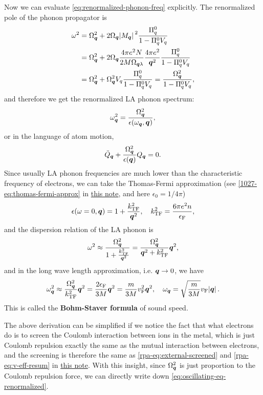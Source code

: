 \documentclass[hyperref, a4paper]{article}
\newcommand*{\concept}[1]{{\textbf{#1}}}
\newcommand{\rpanote}{\href{./electron-gas.pdf}{this note}}
\newcommand{\advancedelenote}{\href{../advanced-electrodynamics/lecture-10-27.pdf}{this note}}
\begin{document}
Now we can evaluate \eqref{eq:renormalized-phonon-freq} explicitly. The renormalized pole of the phonon propagator is 
\[
    \begin{aligned}
        \omega^2 &= \Omega^2_{\vb*{q}} + 2 \Omega_{\vb*{q}} \abs*{M_{\vb*{q}}}^2 \frac{\Pi^0_q}{1 - \Pi^0_q V_q} \\
        &= \Omega^2_{\vb*{q}} + 2 \Omega_{\vb*{q}} \frac{4 \pi e^2 N}{2M \Omega_{\vb*{q} \lambda}} \frac{4 \pi e^2}{\vb*{q}^2} \frac{\Pi^0_q}{1 - \Pi^0_q V_q}  \\
        &= \Omega^2_{\vb*{q}} + \Omega^2_{\vb*{q}} V_q \frac{\Pi^0_q}{1 - \Pi^0_q V_q} = \frac{\Omega^2_{\vb*{q}}}{1 - \Pi^0_q V_q},
    \end{aligned}
\]
and therefore we get the renormalized LA phonon spectrum:
\begin{equation}
    \omega_{\vb*{q}}^2 = \frac{\Omega_{\vb*{q}}^2}{\epsilon(\omega_{\vb*{q}}, \vb*{q})} ,
\end{equation}
or in the language of atom motion, 
\begin{equation}
    \ddot{Q}_{\vb*{q}} + \frac{\Omega_{\vb*{q}}^2}{\epsilon(\vb*{q})} Q_{\vb*{q}} = 0.
    \label{eq:oscillating-eq-renormalized}
\end{equation}
Since usually LA phonon frequencies are much lower than the characteristic frequency of electrons, we can take 
the Thomas-Fermi approximation (see \eqref{1027-eq:thomas-fermi-approx} in \advancedelenote, and here $\epsilon_0 = 1 / 4 \pi$)
\begin{equation}
    \epsilon(\omega=0, \vb*{q}) = 1 + \frac{k_\text{TF}^2}{\vb*{q}^2}, \quad k_\text{TF}^2 = \frac{6 \pi e^2 n}{\epsilon_\text{F}},
\end{equation}
and the dispersion relation of the LA phonon is 
\[
    \omega^2 \approx \frac{\Omega^2_{\vb*{q}}}{1 + \frac{k_\text{TF}^2}{\vb*{q}^2}} = \frac{\Omega^2_{\vb*{q}}}{\vb*{q}^2 + k_\text{TF}^2} \vb*{q}^2,
\] 
and in the long wave length approximation, i.e. $\vb*{q} \to 0$, we have 
\begin{equation}
    \omega_{\vb*{q}}^2 \approx \frac{\Omega^2_{\vb*{q}}}{k_\text{TF}^2} \vb*{q}^2 = \frac{2 \epsilon_\text{F}}{3M} \vb*{q}^2 = \frac{m}{3 M} v_\text{F}^2 \vb*{q}^2, \quad \omega_{\vb*{q}} = \sqrt{\frac{m}{3M}} v_\text{F} \abs*{\vb*{q}}. 
\end{equation}
This is called the \concept{Bohm-Staver formula} of sound speed.

The above derivation can be simplified if we notice the fact that what electrons do is to screen the Coulomb 
interaction between ions in the metal, which is just Coulomb repulsion exactly the same as the mutual 
interaction between electrons, and the screening is therefore the same as \eqref{rpa-eq:external-screened} 
and  \eqref{rpa-eq:v-eff-resum} in \rpanote. 
With this insight, since $\Omega_{\vb*{q}}^2$ is just proportion to 
the Coulomb repulsion force, we can directly write down \eqref{eq:oscillating-eq-renormalized}. 
\end{document}

